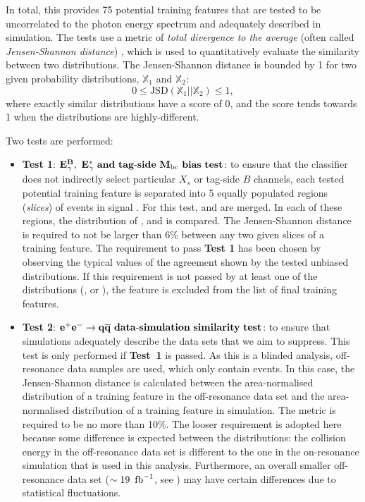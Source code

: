 In total, this provides 75 potential training features that are tested to be uncorrelated to the photon energy spectrum and adequately described in simulation.
The tests use a metric of \textit{total divergence to the average} (often called \textit{Jensen-Shannon distance}) \cite{Lin:1991abc},
which is used to quantitatively evaluate the similarity between two distributions.
The Jensen-Shannon distance is bounded by 1 for two given probability distributions, $\mathbb{X}_1$ and $\mathbb{X}_2$:
\begin{equation}\label{eq:js_distance}
    0\leq\mathrm{JSD}(\mathbb{X}_1||\mathbb{X}_2) \leq1,
\end{equation}
where exactly similar distributions have a score of 0, and the score tends towards 1 when the distributions are highly-different.

Two tests are performed:
\begin{itemize}
    \item \textbf{Test 1}: $\mathbf{{E^B_{\gamma}},~{E^*_{\gamma}}~and~tag\mbox{-}side~{M_{\mathrm{bc}}}~bias~test}$:
    to ensure that the classifier does not indirectly select particular $X_s$ or tag-side $B$ channels,
    each tested potential training feature is separated into 5 equally populated regions (\textit{slices}) of \BtoXsgamma events in signal \MC.
    For this test, \BptoXsgamma and \BztoXsgamma are merged.
    In each of these regions, the distribution of \EB, \Estar and \Mbc is compared.
    The Jensen-Shannon distance is required to not be larger than 6\% between any two given slices of a training feature.
    The requirement to pass \textbf{Test 1} has been chosen by observing the typical values of the agreement shown by the tested unbiased distributions.
    If this requirement is not passed by at least one of the distributions (\EB, \Estar or \Mbc), the feature is excluded from the list of final \BDT training features.
    \item \textbf{Test 2}: $\mathbf{e^+e^-\rightarrow q\overline q~data\mbox{-}simulation~similarity~test}$:
    to ensure that simulations adequately describe the data sets that we aim to suppress.
    This test is only performed if \textbf{Test~1} is passed.
    As this is a blinded analysis, off-resonance data samples are used, which only contain \epem\ra\qqbar events.
    In this case, the Jensen-Shannon distance is calculated between 
    the area-normalised distribution of a training feature in the off-resonance data set
    and the area-normalised distribution of a training feature in \epem\ra\qqbar simulation.
    The metric is required to be no more than 10\%.
    The looser requirement is adopted here because some difference is expected between the distributions:
    the collision energy in the off-resonance data set is different to the one in the on-resonance simulation that is used in this analysis.
    Furthermore, an overall smaller off-resonance data set ($\sim19~\mbox{\,fb}^{-1}$, see ) may have certain differences due to statistical fluctuations.
\end{itemize}

